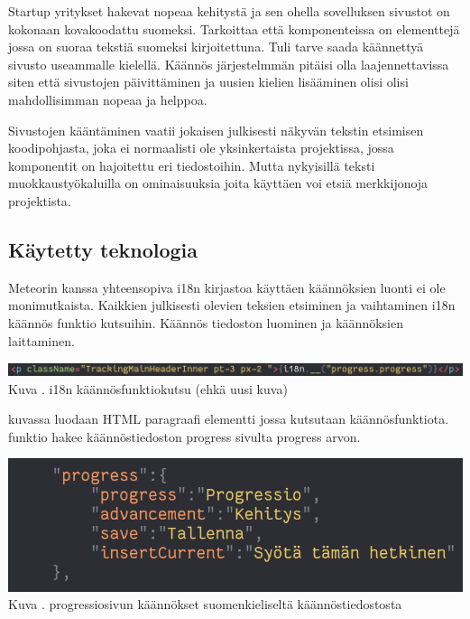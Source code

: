 \documentclass[11pt,a4paper,titlepage,oneside]{article}
\begin{document}
Startup yritykset hakevat nopeaa kehitystä ja sen ohella sovelluksen sivustot on kokonaan kovakoodattu suomeksi.
Tarkoittaa että komponenteissa on elementtejä jossa on suoraa tekstiä suomeksi kirjoitettuna.
Tuli tarve saada käännettyä sivusto useammalle kielellä.
Käännös järjestelmmän pitäisi olla laajennettavissa siten että sivustojen päivittäminen ja uusien kielien lisääminen olisi 
olisi mahdollisimman nopeaa ja helppoa.

\medskip


Sivustojen kääntäminen vaatii jokaisen julkisesti näkyvän tekstin etsimisen koodipohjasta, 
joka ei normaalisti ole yksinkertaista projektissa, jossa komponentit on hajoitettu eri tiedostoihin.
Mutta nykyisillä teksti muokkaustyökaluilla on ominaisuuksia joita käyttäen voi etsiä merkkijonoja projektista.





\subsection{Käytetty teknologia}
Meteorin kanssa yhteensopiva i18n kirjastoa käyttäen käännöksien luonti ei ole monimutkaista.
Kaikkien julkisesti olevien teksien etsiminen ja vaihtaminen i18n käännös funktio kutsuihin.
Käännös tiedoston luominen ja käännöksien laittaminen.
\bigskip

\includegraphics[width = 15cm]{src/public/oppar/translationcall.png}\\
Kuva \getImgCount. {} i18n käännösfunktiokutsu (ehkä uusi kuva)
\medskip

kuvassa luodaan HTML paragraafi elementti jossa kutsutaan käännösfunktiota. funktio hakee käännöstiedoston progress sivulta progress arvon.
\bigskip

\includegraphics[width = 15cm]{src/public/oppar/translationfile.png}\\
Kuva \getImgCount. {} progressiosivun käännökset suomenkieliseltä käännöstiedostosta
\medskip
\end{document}
